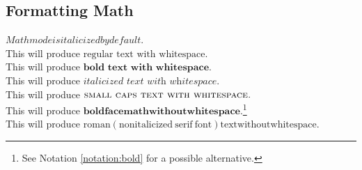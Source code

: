 \documentclass{article} 		%
\begin{document}
\subsection{Formatting Math} \label{subsec:formatting-math}
$Math mode is italicized by default$. \\
This will produce $\text{regular text with whitespace.}$ \\
This will produce $\textbf{bold text with whitespace.}$ \\
This will produce $\textit{italicized text with whitespace.}$ \\
This will produce $\textsc{small caps text with whitespace.}$ \\
This will produce $\mathbf{boldface math without whitespace}$.\footnote{
	See Notation \ref{notation:bold} for a possible alternative.
} \\
This will produce $\mathrm{roman (nonitalicized\ serif\ font) text without whitespace}$. 
\end{document}
